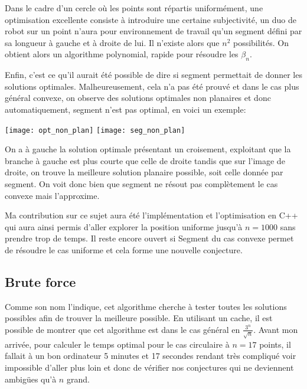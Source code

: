 Dans le cadre d'un cercle où les points sont répartis uniformément, une optimisation excellente consiste à introduire une certaine subjectivité, un duo de robot sur un point n'aura pour environnement de travail qu'un segment défini par sa longueur à gauche et à droite de lui. Il n'existe alors que $n^2$ possibilités. On obtient alors un algorithme polynomial, rapide pour résoudre les $\beta_n$. 

Enfin, c'est ce qu'il aurait été possible de dire si segment permettait de donner les solutions optimales. Malheureusement, cela n'a pas été prouvé et dans le cas plus général convexe, on observe des solutions optimales non planaires et donc automatiquement, segment n'est pas optimal, en voici un exemple:

\texttt{[image: opt\_non\_plan]}
\texttt{[image: seg\_non\_plan]}

On a à gauche la solution optimale présentant un croisement, exploitant que la branche à gauche est plus courte que celle de droite tandis que sur l'image de droite, on trouve la meilleure solution planaire possible, soit celle donnée par segment. On voit donc bien que segment ne résout pas complètement le cas convexe mais l'approxime.

Ma contribution sur ce sujet aura été l'implémentation et l'optimisation en C++ qui aura ainsi permis d'aller explorer la position uniforme jusqu'à $n = 1000$ sans prendre trop de temps. Il reste encore ouvert si Segment du cas convexe permet de résoudre le cas uniforme et cela forme une nouvelle conjecture.

\subsection{Brute force}

Comme son nom l'indique, cet algorithme cherche à tester toutes les solutions possibles afin de trouver la meilleure possible. En utilisant un cache, il est possible de montrer que cet algorithme est dans le cas général en $\frac{3^n}{\sqrt{n}}$. Avant mon arrivée, pour calculer le temps optimal pour le cas circulaire à $n = 17$ points, il fallait à un bon ordinateur 5 minutes et 17 secondes rendant très compliqué voir impossible d'aller plus loin et donc de vérifier nos conjectures qui ne deviennent ambigües qu'à $n$ grand.

